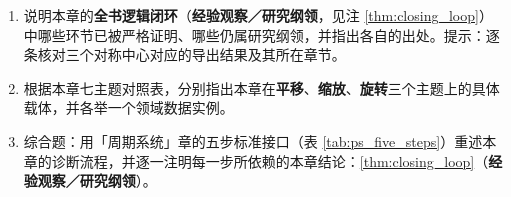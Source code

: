 \begin{enumerate}[leftmargin=3em, label=\textbf{题 \arabic*}]
    \item 说明本章的\textbf{全书逻辑闭环}（\textbf{经验观察／研究纲领}，见注 \ref{thm:closing_loop}）中哪些环节已被严格证明、哪些仍属研究纲领，并指出各自的出处。提示：逐条核对三个对称中心对应的导出结果及其所在章节。

    \item 根据本章七主题对照表，分别指出本章在\textbf{平移}、\textbf{缩放}、\textbf{旋转}三个主题上的具体载体，并各举一个领域数据实例。

    \item 综合题：用「周期系统」章的五步标准接口（表 \ref{tab:ps_five_steps}）重述本章的诊断流程，并逐一注明每一步所依赖的本章结论：\ref{thm:closing_loop}（\textbf{经验观察／研究纲领}）。
\end{enumerate}

